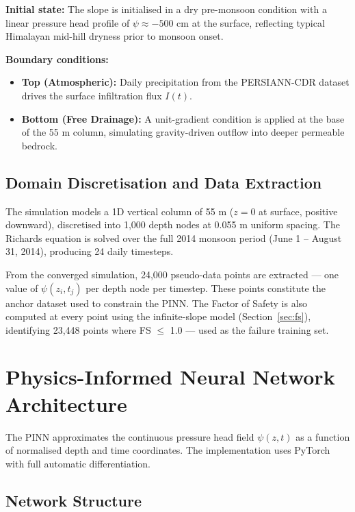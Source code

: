 \documentclass[12pt]{report}
\begin{document}
\textbf{Initial state:} The slope is initialised in a dry pre-monsoon
condition with a linear pressure head profile of $\psi \approx -500$
cm at the surface, reflecting typical Himalayan mid-hill dryness prior
to monsoon onset.

\textbf{Boundary conditions:}
\begin{itemize}
    \item \textbf{Top (Atmospheric):} Daily precipitation from the
    PERSIANN-CDR dataset drives the surface infiltration flux $I(t)$.

    \item \textbf{Bottom (Free Drainage):} A unit-gradient condition
    is applied at the base of the 55 m column, simulating
    gravity-driven outflow into deeper permeable bedrock.
\end{itemize}

\subsection{Domain Discretisation and Data Extraction}

The simulation models a 1D vertical column of 55 m ($z = 0$ at
surface, positive downward), discretised into 1,000 depth nodes at
0.055 m uniform spacing. The Richards equation is solved over the full
2014 monsoon period (June 1 -- August 31, 2014), producing 24
daily timesteps.

From the converged simulation, 24,000 pseudo-data points are extracted
— one value of $\psi(z_i, t_j)$ per depth node per timestep. These
points constitute the anchor dataset used to constrain the PINN. The
Factor of Safety is also computed at every point using the
infinite-slope model (Section~\ref{sec:fs}), identifying 23,448 points
where FS $\leq$ 1.0 — used as the failure training set.

\section{Physics-Informed Neural Network Architecture}

The PINN approximates the continuous pressure head field $\psi(z,t)$
as a function of normalised depth and time coordinates. The
implementation uses PyTorch with full automatic differentiation.

\subsection{Network Structure}
\end{document}
